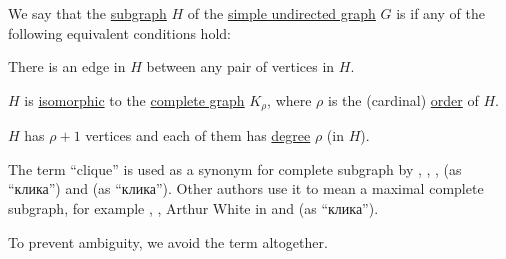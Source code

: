 \begin{definition}\label{def:complete_subgraph}\mimprovised
  We say that the \hyperref[def:undirected_graph/subgraph]{subgraph} \( H \) of the \hyperref[def:undirected_graph]{simple undirected graph} \( G \) is  if any of the following equivalent conditions hold:
  \begin{thmenum}
     There is an edge in \( H \) between any pair of vertices in \( H \).

     \( H \) is \hyperref[def:undirected_graph/homomorphism]{isomorphic} to the \hyperref[def:complete_graph]{complete graph} \( K_\rho \), where \( \rho \) is the (cardinal) \hyperref[def:graph_cardinality/order]{order} of \( H \).

     \( H \) has \( \rho + 1 \) vertices and each of them has \hyperref[def:graph_cardinality/undirected_degree]{degree} \( \rho \) (in \( H \)).
  \end{thmenum}
\end{definition}
\begin{comments}
  \item The term \enquote{clique} is used as a synonym for complete subgraph by , , ,  (as \enquote{клика}) and  (as \enquote{клика}). Other authors use it to mean a maximal complete subgraph, for example , , Arthur White in \cite[596]{Rosen1999} and  (as \enquote{клика}).

  To prevent ambiguity, we avoid the term altogether.
\end{comments}
